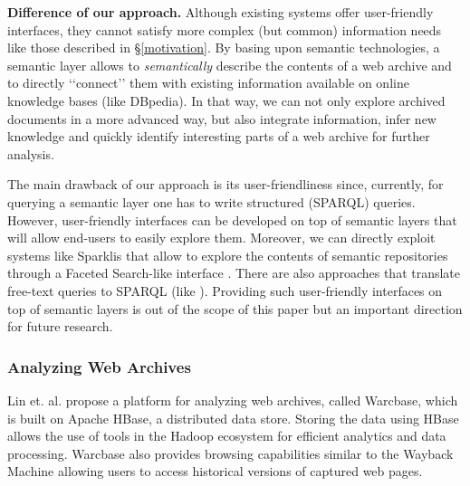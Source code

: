 \documentclass{libtex/sig-alternate-05-2015}
\newcommand{\q}[1]{\lq\lq{}{}#1\rq\rq{}{}}
\begin{document}

\vspace{0.5mm} \noindent
{\bf Difference of our approach.}
Although existing systems offer user-friendly interfaces,
they cannot satisfy more complex (but common) information needs
like those described in \S \ref{motivation}.
By basing upon semantic technologies, a semantic layer
allows to {\em semantically} describe the contents of a web archive
and to directly \q{connect} them with existing information available
on online knowledge bases (like DBpedia).
In that way, we can not only explore archived documents in a more advanced way,
but also integrate information, infer new knowledge and quickly
identify interesting parts of a web archive for further analysis.

The main drawback of our approach is its user-friendliness since,
currently, for querying a semantic layer one has to write structured (SPARQL) queries.
However, user-friendly interfaces can be developed on top of semantic layers
that will allow end-users to easily explore them.
Moreover, we can directly exploit
systems like Sparklis \cite{ferre2014sparklis} %
that allow to explore the contents of semantic repositories through
a Faceted Search-like interface \cite{sacco2009dynamic,tzitzikas2016faceted}.
There are also approaches that translate free-text que\-ries to SPARQL
(like \cite{unger2012template}).
Providing such user-friendly interfaces on top of semantic layers
is out of the scope of this paper but
an important direction for future research.



\subsubsection{Analyzing Web Archives}

Lin et. al. \cite{lin2014infrastructure} propose a platform
for analyzing web archives, called Warcbase,
which is built on Apache HBase,
a distributed data store.
Storing the data using HBase allows the use of tools in the
Hadoop ecosystem for efficient analytics and data processing.
Warcbase also provides  browsing capabilities similar to the Wayback Machine
allowing users to access historical versions of captured web pages.
\end{document}
